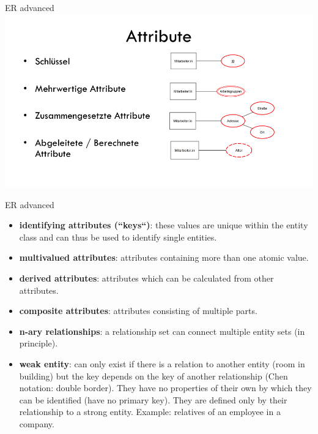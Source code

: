 \begin{frame}{ER advanced}
    \includegraphics[width=\textwidth]{img/attribute.png}
\end{frame}


\begin{frame}[allowframebreaks]{ER advanced}
    \begin{itemize}
        \item \textbf{identifying attributes (``keys``)}: these values are unique within the entity class and can thus be used to identify single entities. 
        \item \textbf{multivalued attributes}: attributes containing more than one atomic value.
        \item \textbf{derived attributes}: attributes which can be calculated from other attributes.
        \item \textbf{composite attributes}: attributes consisting of multiple parts.
    \end{itemize}
    
    \framebreak
    
    \begin{itemize}
        \item \textbf{n-ary relationships}: a relationship set can connect multiple entity sets (in principle). 
        \item \textbf{weak entity}: can only exist if there is a relation to another entity (room in building) but the key depends on the key of another relationship (Chen notation: double border). They have no properties of their own by which they can be identified (have no primary key). They are defined only by their relationship to a strong entity. Example: relatives of an employee in a company.
    \end{itemize}
\end{frame}

